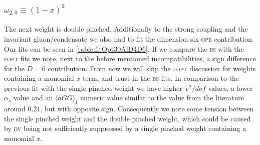 \documentclass[../../index.tex]{subfiles}
\begin{document}
\subsubsection{\(\omega_{2,0} \equiv (1-x)^2\)}
The next weight is double pinched. Additionally to the strong coupling and the
invariant gluon\-/condensate we also had to fit the dimension six \textsc{ope}
contribution. Our fits can be seen in \cref{table:fitOpt30AlD4D6}. If we compare
the \textsc{bs} with the \textsc{fopt} fits we note, next to the before
mentioned incompatibilities, a sign difference for the \(D=6\) contribution.
From now we will skip the \textsc{fopt} discussion for weights containing a
monomial \(x\) term, and trust in the \textsc{bs} fits. In comparison to the
previous fit with the single pinched weight we have higher \(\chi^2/dof\)
values, a lower \(\alpha_s\) value and an \(\langle aGG \rangle_I\) numeric
value similar to the value from the literature around \(0.21\), but with
opposite sign. Consequently we note some tension between the single pinched
weight and the double pinched weight, which could be caused by \textsc{dv} being
not sufficiently suppressed by a single pinched weight containing a monomial
\(x\).
\end{document}
